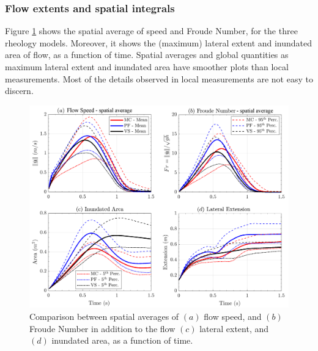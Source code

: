 \documentclass{article}
\begin{document}
\subsubsection{Flow extents and spatial integrals}
Figure \ref{fig:Ramp-spatial} shows the spatial average of speed and Froude Number, for the three rheology models. Moreover, it shows the (maximum) lateral extent and inundated area of flow, as a function of time. Spatial averages and global quantities as maximum lateral extent and inundated area have smoother plots than local measurements. Most of the details observed in local measurements are not easy to discern. 
\begin{figure}[H]
        \centering
        \includegraphics[width=1\textwidth]{InclinedPlane/AveragedMeasurments/Averaged_MeasuresIncline.png}
        \caption{Comparison between spatial averages of $(a)$ flow speed, and $(b)$ Froude Number in addition to the flow $(c)$ lateral extent, and $(d)$ inundated area, as a function of time.}
        \label{fig:Ramp-spatial}
\end{figure}
\end{document}
